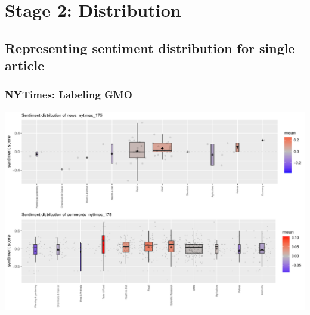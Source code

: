 \documentclass{tum-presentation}
\begin{document}
\section{Stage 2: Distribution}
\begin{frame}
\end{frame}


\subsection{Representing sentiment distribution for single article}

\begin{frame}
  \frametitle{NYTimes: Labeling GMO}
  \includegraphics[width =0.65 \textwidth]{figures/boxplot_nytimes_175.pdf}
  
\end{frame}
\end{document}
